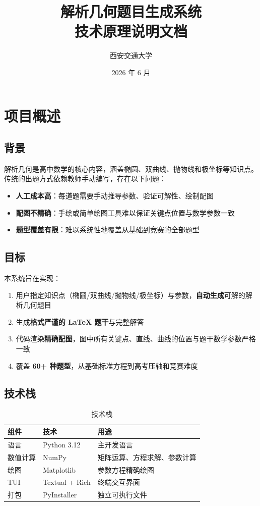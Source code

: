 \documentclass[11pt,a4paper]{article}
\title{\Huge 解析几何题目生成系统 \\ \Large 技术原理说明文档}
\author{西安交通大学}
\date{2026 年 6 月}
\begin{document}
\maketitle
\tableofcontents
\newpage

\section{项目概述}

\subsection{背景}

解析几何是高中数学的核心内容，涵盖椭圆、双曲线、抛物线和极坐标等知识点。传统的出题方式依赖教师手动编写，存在以下问题：

\begin{itemize}
    \item \textbf{人工成本高}：每道题需要手动推导参数、验证可解性、绘制配图
    \item \textbf{配图不精确}：手绘或简单绘图工具难以保证关键点位置与数学参数一致
    \item \textbf{题型覆盖有限}：难以系统性地覆盖从基础到竞赛的全部题型
\end{itemize}

\subsection{目标}

本系统旨在实现：

\begin{enumerate}
    \item 用户指定知识点（椭圆/双曲线/抛物线/极坐标）与参数，\textbf{自动生成}可解的解析几何题目
    \item 生成\textbf{格式严谨的 LaTeX 题干}与完整解答
    \item 代码渲染\textbf{精确配图}，图中所有关键点、直线、曲线的位置与题干数学参数严格一致
    \item 覆盖 \textbf{60+ 种题型}，从基础标准方程到高考压轴和竞赛难度
\end{enumerate}

\subsection{技术栈}

\begin{table}[h]
\centering
\begin{tabular}{lll}
\toprule
组件 & 技术 & 用途 \\
\midrule
语言 & Python 3.12 & 主开发语言 \\
数值计算 & NumPy & 矩阵运算、方程求解、参数计算 \\
绘图 & Matplotlib & 参数方程精确绘图 \\
TUI & Textual + Rich & 终端交互界面 \\
打包 & PyInstaller & 独立可执行文件 \\
\bottomrule
\end{tabular}
\caption{技术栈}
\end{table}
\end{document}
